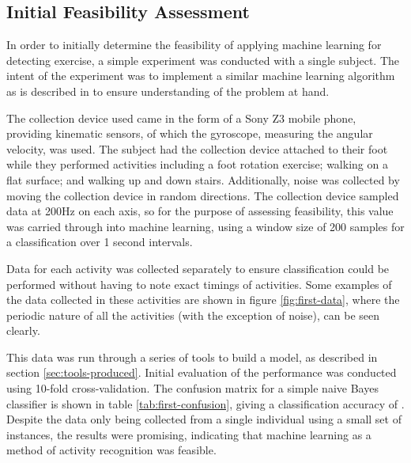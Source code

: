 
\subsection{Initial Feasibility Assessment}
In order to initially determine the feasibility of applying machine learning for detecting exercise, a simple experiment was conducted with a single subject. The intent of the experiment was to implement a similar machine learning algorithm as is described in \cite{kwapisz2011activity} to ensure understanding of the problem at hand.

The collection device used came in the form of a Sony Z3 mobile phone, providing kinematic sensors, of which the gyroscope, measuring the angular velocity, was used. The subject had the collection device attached to their foot while they performed activities including a foot rotation exercise; walking on a flat surface; and walking up and down stairs. Additionally, noise was collected by moving the collection device in random directions. The collection device sampled data at 200Hz on each axis, so for the purpose of assessing feasibility, this value was carried through into machine learning, using a window size of 200 samples for a classification over 1 second intervals.

Data for each activity was collected separately to ensure classification could be performed without having to note exact timings of activities. Some examples of the data collected in these activities are shown in figure \ref{fig:first-data}, where the periodic nature of all the activities (with the exception of noise), can be seen clearly. 

This data was run through a series of tools to build a model, as described in section \ref{sec:tools-produced}. Initial evaluation of the performance was conducted using 10-fold cross-validation. The confusion matrix for a simple naive Bayes classifier is shown in table \ref{tab:first-confusion}, giving a classification accuracy of \todo{}. Despite the data only being collected from a single individual using a small set of instances, the results were promising, indicating that machine learning as a method of activity recognition was feasible.

